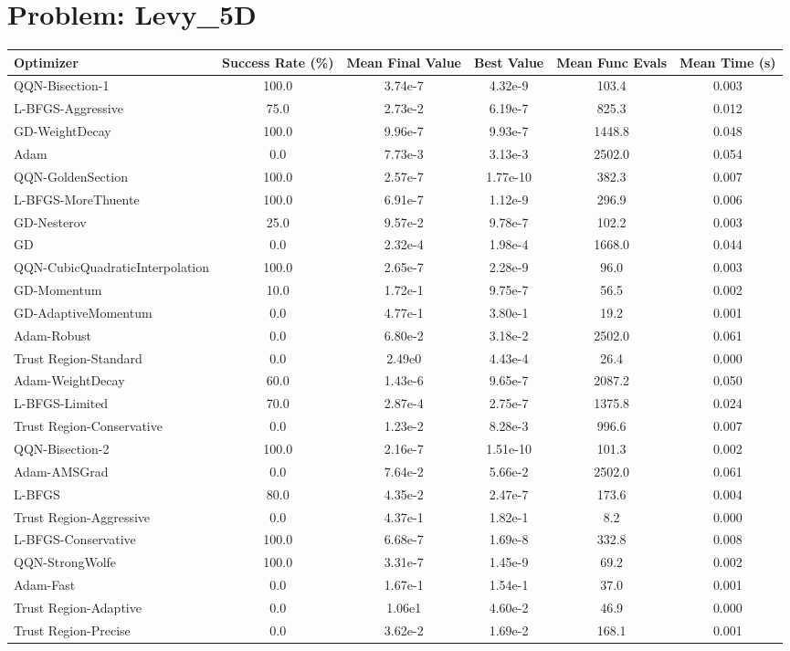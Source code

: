 \documentclass{article}
\begin{document}
\section{Problem: Levy\_5D}
\begin{longtable}{p{3cm}*{5}{c}}
\toprule
\textbf{Optimizer} & \textbf{Success Rate (\%)} & \textbf{Mean Final Value} & \textbf{Best Value} & \textbf{Mean Func Evals} & \textbf{Mean Time (s)} \\
\midrule
QQN-Bisection-1 & 100.0 & 3.74e-7 & 4.32e-9 & 103.4 & 0.003 \\
L-BFGS-Aggressive & 75.0 & 2.73e-2 & 6.19e-7 & 825.3 & 0.012 \\
GD-WeightDecay & 100.0 & 9.96e-7 & 9.93e-7 & 1448.8 & 0.048 \\
Adam & 0.0 & 7.73e-3 & 3.13e-3 & 2502.0 & 0.054 \\
QQN-GoldenSection & 100.0 & 2.57e-7 & 1.77e-10 & 382.3 & 0.007 \\
L-BFGS-MoreThuente & 100.0 & 6.91e-7 & 1.12e-9 & 296.9 & 0.006 \\
GD-Nesterov & 25.0 & 9.57e-2 & 9.78e-7 & 102.2 & 0.003 \\
GD & 0.0 & 2.32e-4 & 1.98e-4 & 1668.0 & 0.044 \\
QQN-CubicQuadraticInterpolation & 100.0 & 2.65e-7 & 2.28e-9 & 96.0 & 0.003 \\
GD-Momentum & 10.0 & 1.72e-1 & 9.75e-7 & 56.5 & 0.002 \\
GD-AdaptiveMomentum & 0.0 & 4.77e-1 & 3.80e-1 & 19.2 & 0.001 \\
Adam-Robust & 0.0 & 6.80e-2 & 3.18e-2 & 2502.0 & 0.061 \\
Trust Region-Standard & 0.0 & 2.49e0 & 4.43e-4 & 26.4 & 0.000 \\
Adam-WeightDecay & 60.0 & 1.43e-6 & 9.65e-7 & 2087.2 & 0.050 \\
L-BFGS-Limited & 70.0 & 2.87e-4 & 2.75e-7 & 1375.8 & 0.024 \\
Trust Region-Conservative & 0.0 & 1.23e-2 & 8.28e-3 & 996.6 & 0.007 \\
QQN-Bisection-2 & 100.0 & 2.16e-7 & 1.51e-10 & 101.3 & 0.002 \\
Adam-AMSGrad & 0.0 & 7.64e-2 & 5.66e-2 & 2502.0 & 0.061 \\
L-BFGS & 80.0 & 4.35e-2 & 2.47e-7 & 173.6 & 0.004 \\
Trust Region-Aggressive & 0.0 & 4.37e-1 & 1.82e-1 & 8.2 & 0.000 \\
L-BFGS-Conservative & 100.0 & 6.68e-7 & 1.69e-8 & 332.8 & 0.008 \\
QQN-StrongWolfe & 100.0 & 3.31e-7 & 1.45e-9 & 69.2 & 0.002 \\
Adam-Fast & 0.0 & 1.67e-1 & 1.54e-1 & 37.0 & 0.001 \\
Trust Region-Adaptive & 0.0 & 1.06e1 & 4.60e-2 & 46.9 & 0.000 \\
Trust Region-Precise & 0.0 & 3.62e-2 & 1.69e-2 & 168.1 & 0.001 \\
\bottomrule
\end{longtable}
\end{document}
